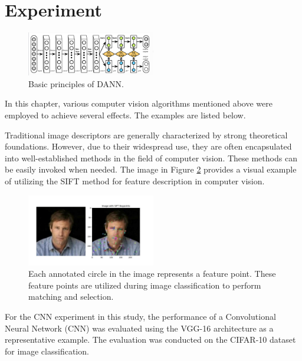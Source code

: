 \documentclass[10pt,twocolumn,letterpaper]{article}
\begin{document}
\section{Experiment}


\begin{figure}
  \centering %
  \includegraphics[width=0.5\textwidth]{image7.png} %
  \caption{Basic principles of DANN.} %
  \label{fig7}
\end{figure}

In this chapter, various computer vision algorithms mentioned above were employed to achieve several effects. The examples are listed below.

Traditional image descriptors are generally characterized by strong theoretical foundations. However, due to their widespread use, they are often encapsulated into well-established methods in the field of computer vision. These methods can be easily invoked when needed. The  image in Figure \ref{fig8} provides a visual example of utilizing the SIFT method for feature description in computer vision.

\begin{figure}
  \centering %
  \includegraphics[width=0.5\textwidth]{image8.jpg} %
  \caption{Each annotated circle in the image represents a feature point. These feature points are utilized during image classification to perform matching and selection.} %
  \label{fig8}
\end{figure}

For the CNN experiment in this study, the performance of a Convolutional Neural Network (CNN) was evaluated using the VGG-16 architecture as a representative example. The evaluation was conducted on the CIFAR-10 dataset for image classification.
\end{document}
